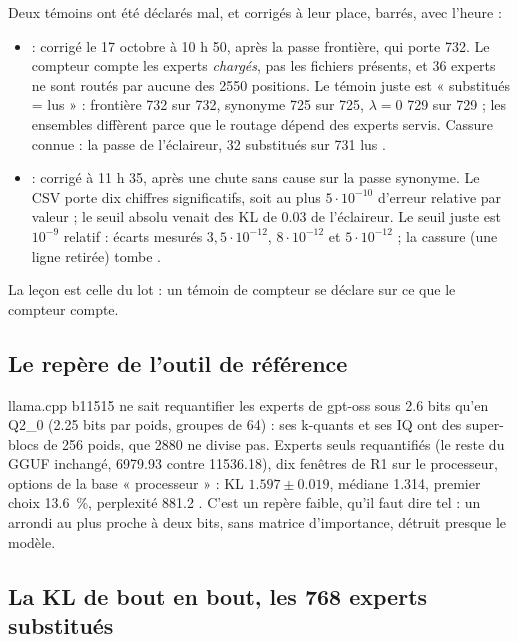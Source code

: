Deux témoins ont été déclarés mal, et corrigés à leur place, barrés, avec l'heure :
\begin{itemize}
\item {} : corrigé le 17 octobre à 10 h 50, après la passe frontière, qui porte 732. Le compteur compte les experts \emph{chargés}, pas les fichiers présents, et 36 experts ne sont routés par aucune des \num{2550} positions. Le témoin juste est « substitués = lus » : frontière 732 sur 732, synonyme 725 sur 725, $\lambda = 0$ 729 sur 729 ; les ensembles diffèrent parce que le routage dépend des experts servis. Cassure connue : la passe de l'éclaireur, 32 substitués sur 731 lus \mes.
\item {} : corrigé à 11 h 35, après une chute sans cause sur la passe synonyme. Le CSV porte dix chiffres significatifs, soit au plus $5\cdot 10^{-10}$ d'erreur relative par valeur ; le seuil absolu venait des KL de \num{0.03} de l'éclaireur. Le seuil juste est $10^{-9}$ relatif : écarts mesurés $3{,}5\cdot 10^{-12}$, $8 \cdot 10^{-12}$ et $5\cdot 10^{-12}$ ; la cassure (une ligne retirée) tombe \mes.
\end{itemize}
La leçon est celle du lot : un témoin de compteur se déclare sur ce que le compteur compte.

\subsection{Le repère de l'outil de référence}\label{t3sno:sec:repere}

llama.cpp b11515 \parencite{ggml2026llamacppb11515} ne sait requantifier les experts de gpt-oss sous \num{2.6} bits qu'en Q2\_0 (\num{2.25} bits par poids, groupes de 64) : ses k-quants et ses IQ ont des super-blocs de 256 poids, que \num{2880} ne divise pas. Experts seuls requantifiés (le reste du GGUF inchangé, \SI{6979.93}{\Mio} contre \num{11536.18}), dix fenêtres de R1 sur le processeur, options de la base « processeur » : KL $\num{1.597} \pm \num{0.019}$, médiane \num{1.314}, premier choix \SI{13.6}{\percent}, perplexité \num{881.2} \mes. C'est un repère faible, qu'il faut dire tel : un arrondi au plus proche à deux bits, sans matrice d'importance, détruit presque le modèle.

\subsection{La KL de bout en bout, les 768 experts substitués}\label{t3sno:sec:kl}

